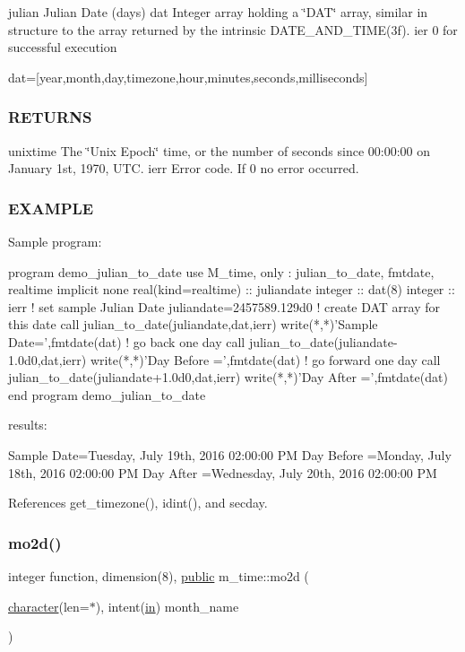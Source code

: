 \begin{DoxyVerb}
julian Julian Date (days) dat Integer array holding a \char`\"{}\+D\+A\+T\char`\"{} array, similar in structure to the array returned by the intrinsic D\+A\+T\+E\+\_\+\+A\+N\+D\+\_\+\+T\+I\+M\+E(3f). ier 0 for successful execution \begin{DoxyVerb}      dat=[year,month,day,timezone,hour,minutes,seconds,milliseconds]
\end{DoxyVerb}
 \subsubsection*{R\+E\+T\+U\+R\+NS}

unixtime The \char`\"{}\+Unix Epoch\char`\"{} time, or the number of seconds since 00\+:00\+:00 on January 1st, 1970, U\+TC. ierr Error code. If 0 no error occurred.

\subsubsection*{E\+X\+A\+M\+P\+LE}

\begin{DoxyVerb}Sample program:

 program demo_julian_to_date
 use M_time, only : julian_to_date, fmtdate, realtime
 implicit none
 real(kind=realtime)     :: juliandate
 integer                 :: dat(8)
 integer                 :: ierr
    ! set sample Julian Date
    juliandate=2457589.129d0
    ! create DAT array for this date
    call julian_to_date(juliandate,dat,ierr)
    write(*,*)'Sample Date=',fmtdate(dat)
    ! go back one day
    call julian_to_date(juliandate-1.0d0,dat,ierr)
    write(*,*)'Day Before =',fmtdate(dat)
    ! go forward one day
    call julian_to_date(juliandate+1.0d0,dat,ierr)
    write(*,*)'Day After  =',fmtdate(dat)
 end program demo_julian_to_date

results:

 Sample Date=Tuesday, July 19th, 2016 02:00:00 PM
 Day Before =Monday, July 18th, 2016 02:00:00 PM
 Day After  =Wednesday, July 20th, 2016 02:00:00 PM \end{DoxyVerb}
 

References get\+\_\+timezone(), idint(), and secday.

\mbox{\label{namespacem__time_aa5877b420e38077f159482f214b2dc47}} 
\subsubsection{\texorpdfstring{mo2d()}{mo2d()}}
{\footnotesize\ttfamily integer function, dimension(8), \hyperlink{M__stopwatch_83_8txt_a2f74811300c361e53b430611a7d1769f}{public} m\+\_\+time\+::mo2d (\begin{DoxyParamCaption}\item[{\hyperlink{option__stopwatch_83_8txt_abd4b21fbbd175834027b5224bfe97e66}{character}(len=$\ast$), intent(\hyperlink{M__journal_83_8txt_afce72651d1eed785a2132bee863b2f38}{in})}]{month\+\_\+name }\end{DoxyParamCaption})}




\end{DoxyVerb}
